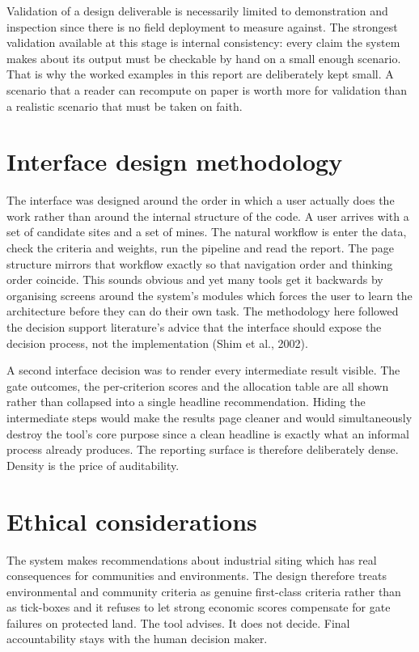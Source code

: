 \documentclass[12pt,a4paper]{report}
\begin{document}
Validation of a design deliverable is necessarily limited to
demonstration and inspection since there is no field deployment to
measure against. The strongest validation available at this stage is
internal consistency: every claim the system makes about its output
must be checkable by hand on a small enough scenario. That is why the
worked examples in this report are deliberately kept small. A scenario
that a reader can recompute on paper is worth more for validation
than a realistic scenario that must be taken on faith.

\section{Interface design methodology}
The interface was designed around the order in which a user actually
does the work rather than around the internal structure of the code.
A user arrives with a set of candidate sites and a set of mines. The
natural workflow is enter the data, check the criteria and weights,
run the pipeline and read the report. The page structure mirrors that
workflow exactly so that navigation order and thinking order coincide.
This sounds obvious and yet many tools get it backwards by organising
screens around the system's modules which forces the user to learn
the architecture before they can do their own task. The methodology
here followed the decision support literature's advice that the
interface should expose the decision process, not the implementation
(Shim et al., 2002).

A second interface decision was to render every intermediate result
visible. The gate outcomes, the per-criterion scores and the
allocation table are all shown rather than collapsed into a single
headline recommendation. Hiding the intermediate steps would make the
results page cleaner and would simultaneously destroy the tool's core
purpose since a clean headline is exactly what an informal process
already produces. The reporting surface is therefore deliberately
dense. Density is the price of auditability.

\section{Ethical considerations}
The system makes recommendations about industrial siting which has
real consequences for communities and environments. The design
therefore treats environmental and community criteria as genuine
first-class criteria rather than as tick-boxes and it refuses to let
strong economic scores compensate for gate failures on protected land.
The tool advises. It does not decide. Final accountability stays with
the human decision maker.
\end{document}
